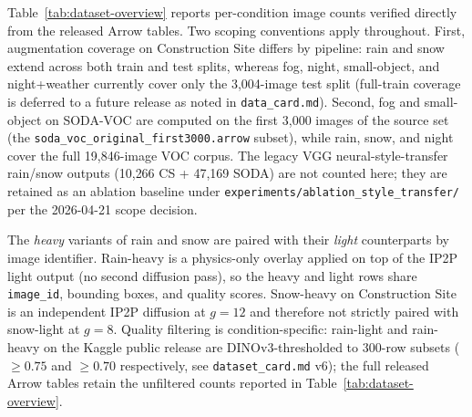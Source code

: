 \documentclass[12pt]{article}
\begin{document}
Table~\ref{tab:dataset-overview} reports per-condition image counts verified directly from the released Arrow tables. Two scoping conventions apply throughout. First, augmentation coverage on Construction Site differs by pipeline: rain and snow extend across both train and test splits, whereas fog, night, small-object, and night+weather currently cover only the 3{,}004-image test split (full-train coverage is deferred to a future release as noted in \texttt{data\_card.md}). Second, fog and small-object on SODA-VOC are computed on the first 3{,}000 images of the source set (the \texttt{soda\_voc\_original\_first3000.arrow} subset), while rain, snow, and night cover the full 19{,}846-image VOC corpus. The legacy VGG neural-style-transfer rain/snow outputs (10{,}266 CS + 47{,}169 SODA) are not counted here; they are retained as an ablation baseline under \texttt{experiments/ablation\_style\_transfer/} per the 2026-04-21 scope decision.

The \emph{heavy} variants of rain and snow are paired with their \emph{light} counterparts by image identifier. Rain-heavy is a physics-only overlay applied on top of the IP2P light output (no second diffusion pass), so the heavy and light rows share \texttt{image\_id}, bounding boxes, and quality scores. Snow-heavy on Construction Site is an independent IP2P diffusion at $g{=}12$ and therefore not strictly paired with snow-light at $g{=}8$. Quality filtering is condition-specific: rain-light and rain-heavy on the Kaggle public release are DINOv3-thresholded to 300-row subsets ($\geq 0.75$ and $\geq 0.70$ respectively, see \texttt{dataset\_card.md} v6); the full released Arrow tables retain the unfiltered counts reported in Table~\ref{tab:dataset-overview}.
\end{document}
